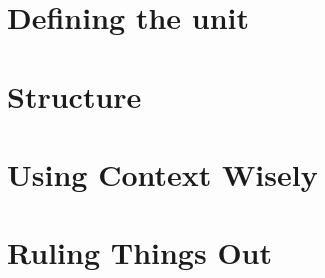 \chapter{Defining the unit}
\chapter{Structure}
\chapter{Using Context Wisely}
\chapter{Ruling Things Out}